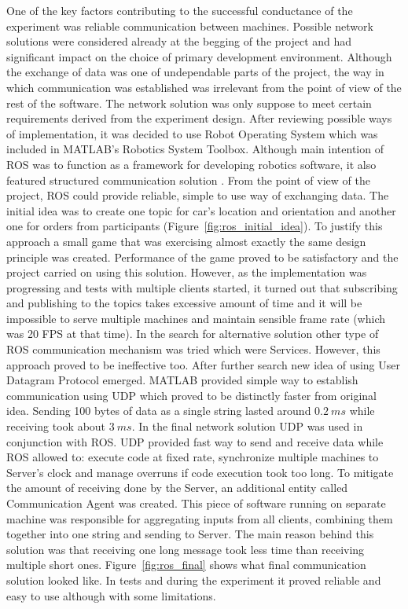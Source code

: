 \documentclass[11pt,english]{article}
\begin{document}
One of the key factors contributing to the successful conductance of the experiment was reliable communication between machines. Possible network solutions were considered already at the begging of the project and had significant impact on the choice of primary development environment. Although the exchange of data was one of undependable parts of the project, the way in which communication was established was irrelevant from the point of view of the rest of the software. The network solution was only suppose to meet certain requirements derived from the experiment design. After reviewing possible ways of implementation, it was decided to use Robot Operating System which was included in MATLAB's Robotics System Toolbox. Although main intention of ROS was to function as a framework for developing robotics software, it also featured structured communication solution \citep{quigley2009ros}. From the point of view of the project, ROS could provide reliable, simple to use way of exchanging data. The initial idea was to create one topic for car's location and orientation and another one for orders from participants (Figure~\ref{fig:ros_initial_idea}). To justify this approach a small game that was exercising almost exactly the same design principle was created. Performance of the game proved to be satisfactory and the project carried on using this solution. 
However, as the implementation was progressing and tests with multiple clients started, it turned out that subscribing and publishing to the topics takes excessive amount of time and it will be impossible to serve multiple machines and maintain sensible frame rate (which was 20 FPS at that time). In the search for alternative solution other type of ROS communication mechanism was tried which were Services. However, this approach proved to be ineffective too. After further search new idea of using User Datagram Protocol emerged. MATLAB provided simple way to establish communication using UDP which proved to be distinctly faster from original idea. Sending 100 bytes of data as a single string lasted around $0.2\:ms$ while receiving took about $3\:ms$. 
In the final network solution UDP was used in conjunction with ROS. UDP provided fast way to send and receive data while ROS allowed to: execute code at fixed rate, synchronize multiple machines to Server's clock and manage overruns if code execution took too long. To 	mitigate the amount of receiving done by the Server, an additional entity called Communication Agent was created. This piece of software running on separate machine was responsible for aggregating inputs from all clients, combining them together into one string and sending to Server. The main reason behind this solution was that receiving one long message took less time than receiving multiple short ones. Figure~\ref{fig:ros_final} shows what final communication solution looked like. In tests and during the experiment it proved reliable and easy to use although with some limitations.
\end{document}
